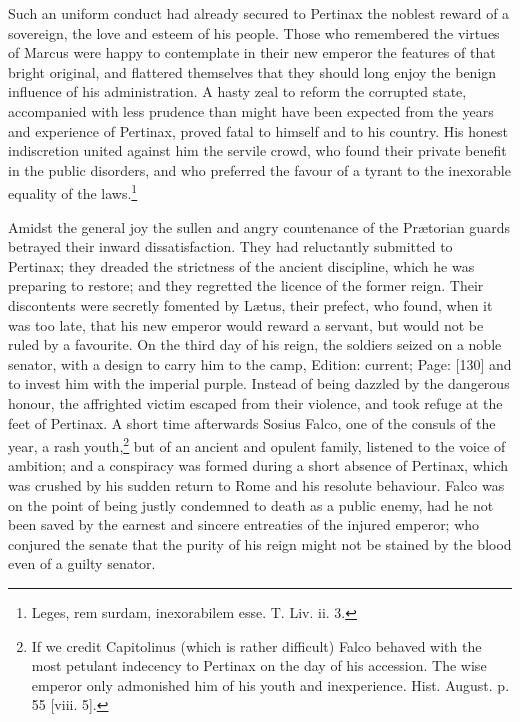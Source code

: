 Such an uniform conduct had already secured to Pertinax the noblest reward of a sovereign, the love and esteem of his people. Those who remembered the virtues of Marcus were happy to contemplate in their new emperor the features of that bright original, and flattered themselves that they should long enjoy the benign influence of his administration. A hasty zeal to reform the corrupted state, accompanied with less prudence than might have been expected from the years and experience of Pertinax, proved fatal to himself and to his country. His honest indiscretion united against him the servile crowd, who found their private benefit in the public disorders, and who preferred the favour of a tyrant to the inexorable equality of the laws.\footnote{Leges, rem surdam, inexorabilem esse. T. Liv. ii. 3.}

Amidst the general joy the sullen and angry countenance of the Prætorian guards betrayed their inward dissatisfaction. They had reluctantly submitted to Pertinax; they dreaded the strictness of the ancient discipline, which he was preparing to restore; and they regretted the licence of the former reign. Their discontents were secretly fomented by Lætus, their prefect, who found, when it was too late, that his new emperor would reward a servant, but would not be ruled by a favourite. On the third day of his reign, the soldiers seized on a noble senator, with a design to carry him to the camp, Edition: current; Page: [130] and to invest him with the imperial purple. Instead of being dazzled by the dangerous honour, the affrighted victim escaped from their violence, and took refuge at the feet of Pertinax. A short time afterwards Sosius Falco, one of the consuls of the year, a rash youth,\footnote{If we credit Capitolinus (which is rather difficult) Falco behaved with the most petulant indecency to Pertinax on the day of his accession. The wise emperor only admonished him of his youth and inexperience. Hist. August. p. 55 [viii. 5].} but of an ancient and opulent family, listened to the voice of ambition; and a conspiracy was formed during a short absence of Pertinax, which was crushed by his sudden return to Rome and his resolute behaviour. Falco was on the point of being justly condemned to death as a public enemy, had he not been saved by the earnest and sincere entreaties of the injured emperor; who conjured the senate that the purity of his reign might not be stained by the blood even of a guilty senator.

